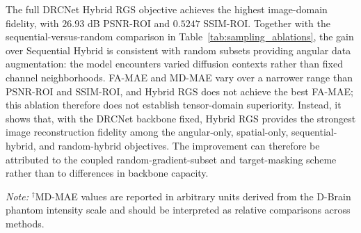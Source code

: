 \documentclass[preprint,12pt]{elsarticle}
\begin{document}
The full DRCNet Hybrid RGS objective achieves the highest image-domain fidelity, with $26.93$ dB PSNR-ROI and $0.5247$ SSIM-ROI. Together with the sequential-versus-random comparison in Table~\ref{tab:sampling_ablations}, the gain over Sequential Hybrid is consistent with random subsets providing angular data augmentation: the model encounters varied diffusion contexts rather than fixed channel neighborhoods. FA-MAE and MD-MAE vary over a narrower range than PSNR-ROI and SSIM-ROI, and Hybrid RGS does not achieve the best FA-MAE; this ablation therefore does not establish tensor-domain superiority. Instead, it shows that, with the DRCNet backbone fixed, Hybrid RGS provides the strongest image reconstruction fidelity among the angular-only, spatial-only, sequential-hybrid, and random-hybrid objectives. The improvement can therefore be attributed to the coupled random-gradient-subset and target-masking scheme rather than to differences in backbone capacity.

\begin{table}[ht]
  \centering
  \caption{Objective-controlled ablation on D-Brain with Rician noise $\sigma=0.1$. All rows use the same DRCNet backbone, training budget, and evaluation protocol. The ablation isolates angular context, target-channel masking, and random gradient-subset sampling.}
  \label{tab:objective_controlled_ablation}
\end{table}
\par\noindent\textit{Note:} $^\dagger$MD-MAE values are reported in arbitrary units derived from the D-Brain phantom intensity scale and should be interpreted as relative comparisons across methods.
\end{document}
